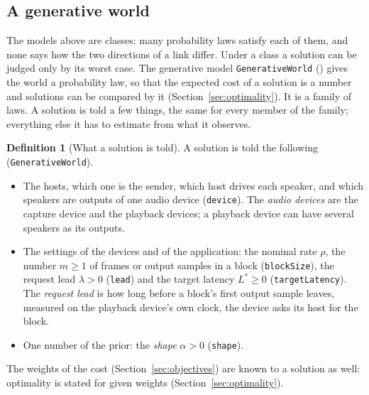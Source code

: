\documentclass[11pt,a4paper]{article}
\newcommand{\lean}[1]{\texttt{#1}}
\theoremstyle{definition}
\newtheorem{definition}{Definition}[section]
\begin{document}
\subsection{A generative world}\label{sec:generative}

The models above are classes: many probability laws satisfy each of them,
and none says how the two directions of a link differ. Under a class a
solution can be judged only by its worst case. The generative model
\lean{GenerativeWorld}
() gives the world a
probability law, so that the expected cost of a solution is a number and
solutions can be compared by it (Section~\ref{sec:optimality}). It is a
family of laws. A solution is told a few things, the same for every member
of the family; everything else it has to estimate from what it observes.

\begin{definition}[What a solution is told]
A solution is told the following (\lean{GenerativeWorld}).
\begin{itemize}
\item The hosts, which one is the sender, which host drives each speaker,
  and which speakers are outputs of one audio device (\lean{device}). The
  \emph{audio devices} are the capture device and the playback devices; a
  playback device can have several speakers as its outputs.
\item The settings of the devices and of the application: the nominal rate
  $\rho$, the number $m \ge 1$ of frames or output samples in a block
  (\lean{blockSize}), the request lead $\lambda > 0$ (\lean{lead}) and the
  target latency $L^* \ge 0$ (\lean{targetLatency}). The \emph{request
  lead} is how long before a block's first output sample leaves, measured on
  the playback device's own clock, the device asks its host for the block.
\item One number of the prior: the \emph{shape} $\alpha > 0$
  (\lean{shape}).
\end{itemize}
The weights of the cost (Section~\ref{sec:objectives}) are known to a
solution as well: optimality is stated for given weights
(Section~\ref{sec:optimality}).
\end{definition}
\end{document}
